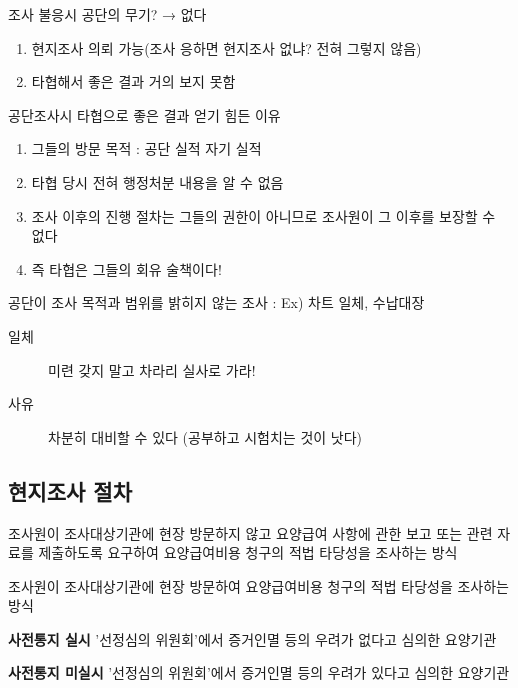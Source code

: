  조사 불응시 공단의 무기? → 없다
 \begin{enumerate}[1)]\tightlist
 \item 현지조사 의뢰 가능(조사 응하면 현지조사 없냐? 전혀 그렇지 않음)
 \item 타협해서 좋은 결과 거의 보지 못함 
 \end{enumerate}

공단조사시 타협으로 좋은 결과 얻기 힘든 이유 
\begin{enumerate}[1)]\tightlist
\item 그들의 방문 목적 : 공단 실적        자기 실적
\item 타협 당시 전혀 행정처분 내용을 알 수 없음
\item 조사 이후의 진행 절차는 그들의 권한이 아니므로 조사원이 그 이후를 보장할 수 없다 
\item 즉 타협은 그들의 회유 술책이다!  
\end{enumerate}

공단이 조사 목적과 범위를 밝히지 않는 조사 : Ex) 차트 일체, 수납대장 \par
\begin{description}
\item[일체] 미련 갖지 말고 차라리 실사로 가라!
\item[사유] 차분히 대비할 수 있다 (공부하고 시험치는 것이 낫다)
\end{description}
\subsection{현지조사 절차}
\begin{description}\tightlist
\item[서면조사] 조사원이 조사대상기관에 현장 방문하지 않고 요양급여 사항에 관한 보고 또는 관련 자료를 제출하도록 요구하여 요양급여비용 청구의 적법 타당성을 조사하는 방식
\item[현장조사] 조사원이 조사대상기관에 현장 방문하여 요양급여비용 청구의 적법 타당성을 조사하는 방식
\end{description}

\textbf{사전통지 실시} '선정심의 위원회'에서 증거인멸 등의 우려가 없다고 심의한 요양기관\par
{}\par

\textbf{사전통지 미실시} '선정심의 위원회'에서 증거인멸 등의 우려가 있다고 심의한 요양기관\par
{}\par

